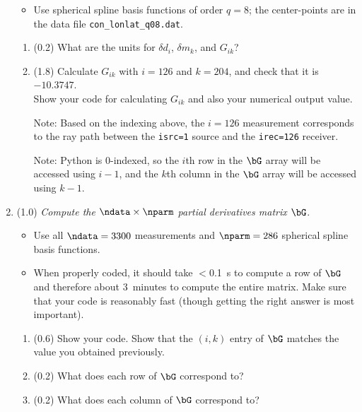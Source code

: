 \documentclass[11pt,titlepage,fleqn]{article}
\begin{document}
\begin{enumerate}
\begin{itemize}
\item Use spherical spline basis functions of order $q=8$; the center-points are in the data file \verb+con_lonlat_q08.dat+.

\end{itemize}

\begin{enumerate}
\item (0.2) What are the units for $\delta d_i$, $\delta m_k$, and $G_{ik}$?

\item (1.8) Calculate $G_{ik}$ with $i=126$ and $k=204$, and check that it is $-10.3747$. \\ Show your code for calculating $G_{ik}$ and also your numerical output value.

Note: Based on the indexing above, the $i=126$ measurement corresponds to the ray path between the \verb+isrc=1+ source and the \verb+irec=126+ receiver.

Note: Python is 0-indexed, so the $i$th row in the $\bG$ array will be accessed using $i-1$, and the $k$th column in the $\bG$ array will be accessed using $k-1$.

\end{enumerate}


\item (1.0) {\em Compute the $\ndata \times \nparm$ partial derivatives matrix $\bG$}.

\begin{itemize}
\item Use all $\ndata=3300$ measurements and $\nparm=286$ spherical spline basis functions.

\item When properly coded, it should take $<$0.1~s to compute a row of $\bG$ and therefore about 3~minutes to compute the entire matrix. Make sure that your code is reasonably fast (though getting the right answer is most important).
\end{itemize}

\begin{enumerate}
\item (0.6) Show your code. Show that the $(i,k)$ entry of $\bG$ matches the value you obtained previously.

\item (0.2) What does each row of $\bG$ correspond to?

\item (0.2) What does each column of $\bG$ correspond to?
\end{enumerate}


\end{enumerate}
\end{document}
